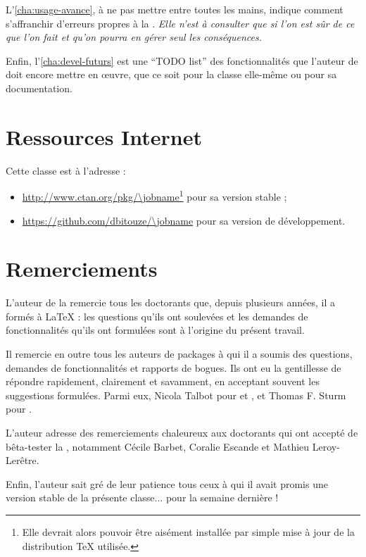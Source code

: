 L'\vref{cha:usage-avance}, à ne pas mettre entre toutes les mains, indique
comment s'affranchir d'erreurs propres à la \yatcl{}. \emph{Elle n'est
  à consulter que si l'on est sûr de ce que l'on fait et qu'on pourra en gérer
  \emph{seul} les conséquences.}

Enfin, l'\vref{cha:devel-futurs} est une \foreignquote{english}{TODO list} des
fonctionnalités que l'auteur de \yat{} doit encore mettre en œuvre, que ce soit
pour la classe elle-même ou pour sa documentation.

\section{Ressources Internet}
\label{sec:ressources-internet}

Cette classe est  à l'adresse :
\begin{itemize}
\item \url{http://www.ctan.org/pkg/\jobname}\footnote{Elle
    devrait alors pouvoir être aisément installée par simple mise à jour de la
    distribution \TeX{} utilisée.} pour sa version stable ;
\item \url{https://github.com/dbitouze/\jobname} pour sa version de
  développement.
\end{itemize}

\section{Remerciements}
\label{sec:remerciements}

L'auteur de la \yatcl{} remercie tous les doctorants que, depuis plusieurs
années, il a formés à \LaTeX{} : les questions qu'ils ont soulevées et les
demandes de fonctionnalités qu'ils ont formulées sont à l'origine du présent
travail.

Il remercie en outre tous les auteurs de packages à qui il a soumis  des questions, demandes de fonctionnalités et
rapports de bogues. Ils ont eu la gentillesse de répondre rapidement,
clairement et savamment, en acceptant souvent les suggestions formulées. Parmi
eux, Nicola Talbot pour  et , et Thomas
F. Sturm pour .

L'auteur adresse des remerciements chaleureux aux doctorants qui ont accepté de
bêta-tester la \yatcl{}, notamment Cécile Barbet, Coralie Escande et Mathieu
Leroy-Lerêtre.

Enfin, l'auteur sait gré de leur patience tous ceux à qui il avait promis une
version stable de la présente classe... pour la semaine dernière !

%
\iffalse
\fi
